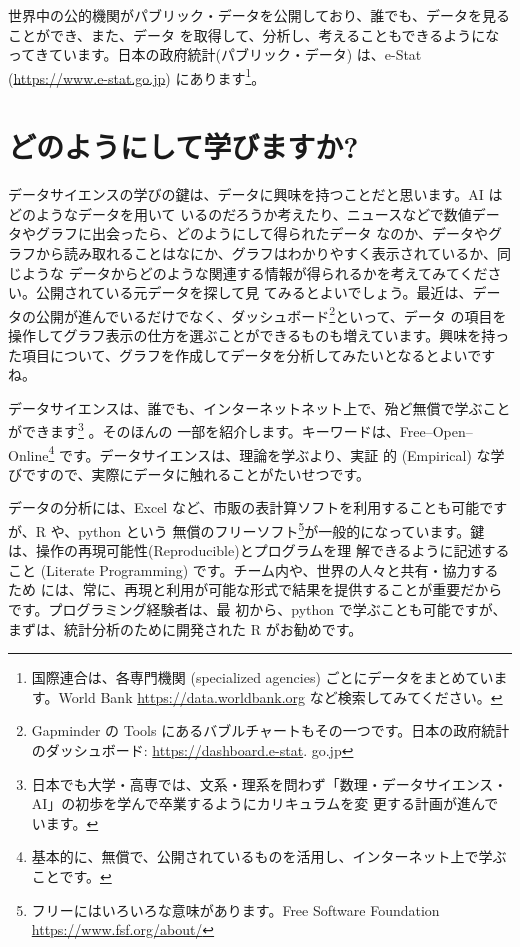 \documentclass[
]{book}
\theoremstyle{definition}
\theoremstyle{definition}
\theoremstyle{definition}
\theoremstyle{definition}
\theoremstyle{remark}
\begin{document}
世界中の公的機関がパブリック・データを公開しており、誰でも、データを見ることができ、また、データ を取得して、分析し、考えることもできるようになってきています。日本の政府統計(パブリック・データ) は、e-Stat (\url{https://www.e-stat.go.jp}) にあります\footnote{国際連合は、各専門機関 (specialized agencies) ごとにデータをまとめています。World Bank \url{https://data.worldbank.org} など検索してみてください。}。

\hypertarget{ux3069ux306eux3088ux3046ux306bux3057ux3066ux5b66ux3073ux307eux3059ux304b}{%
\section{どのようにして学びますか?}\label{ux3069ux306eux3088ux3046ux306bux3057ux3066ux5b66ux3073ux307eux3059ux304b}}

データサイエンスの学びの鍵は、データに興味を持つことだと思います。AI はどのようなデータを用いて いるのだろうか考えたり、ニュースなどで数値データやグラフに出会ったら、どのようにして得られたデータ なのか、データやグラフから読み取れることはなにか、グラフはわかりやすく表示されているか、同じような データからどのような関連する情報が得られるかを考えてみてください。公開されている元データを探して見 てみるとよいでしょう。最近は、データの公開が進んでいるだけでなく、ダッシュボード\footnote{Gapminder の Tools にあるバブルチャートもその一つです。日本の政府統計のダッシュボード: \url{https://dashboard.e-stat}.
  go.jp}といって、データ の項目を操作してグラフ表示の仕方を選ぶことができるものも増えています。興味を持った項目について、グラフを作成してデータを分析してみたいとなるとよいですね。

データサイエンスは、誰でも、インターネットネット上で、殆ど無償で学ぶことができます\footnote{日本でも大学・高専では、文系・理系を問わず「数理・データサイエンス・AI」の初歩を学んで卒業するようにカリキュラムを変 更する計画が進んでいます。} 。そのほんの
一部を紹介します。キーワードは、Free--Open--Online\footnote{基本的に、無償で、公開されているものを活用し、インターネット上で学ぶことです。} です。データサイエンスは、理論を学ぶより、実証 的 (Empirical) な学びですので、実際にデータに触れることがたいせつです。

データの分析には、Excel など、市販の表計算ソフトを利用することも可能ですが、R や、python という 無償のフリーソフト\footnote{フリーにはいろいろな意味があります。Free Software Foundation \url{https://www.fsf.org/about/}}が一般的になっています。鍵は、操作の再現可能性(Reproducible)とプログラムを理 解できるように記述すること (Literate Programming) です。チーム内や、世界の人々と共有・協力するため には、常に、再現と利用が可能な形式で結果を提供することが重要だからです。プログラミング経験者は、最 初から、python で学ぶことも可能ですが、まずは、統計分析のために開発された R がお勧めです。
\end{document}
